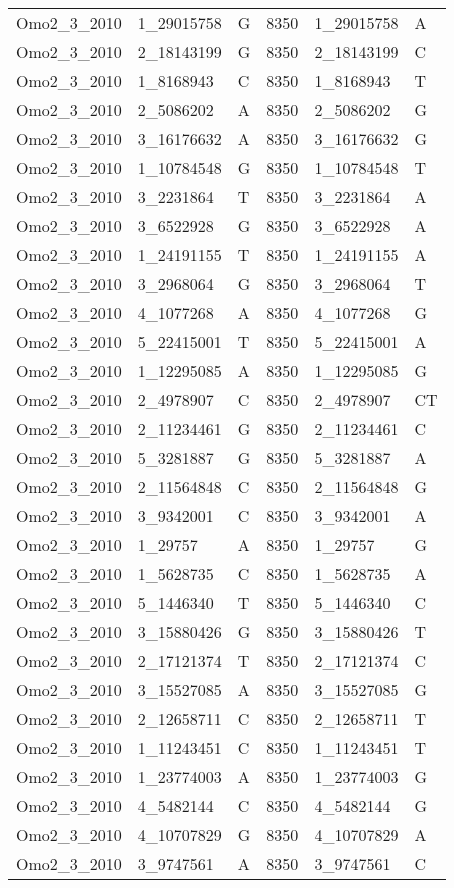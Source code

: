 \begin{center}
\begin{longtable}{|l|l|l|l|l|l|}
Omo2\_3\_2010&1\_29015758&G&8350&1\_29015758&A\\
Omo2\_3\_2010&2\_18143199&G&8350&2\_18143199&C\\
Omo2\_3\_2010&1\_8168943&C&8350&1\_8168943&T\\
Omo2\_3\_2010&2\_5086202&A&8350&2\_5086202&G\\
Omo2\_3\_2010&3\_16176632&A&8350&3\_16176632&G\\
Omo2\_3\_2010&1\_10784548&G&8350&1\_10784548&T\\
Omo2\_3\_2010&3\_2231864&T&8350&3\_2231864&A\\
Omo2\_3\_2010&3\_6522928&G&8350&3\_6522928&A\\
Omo2\_3\_2010&1\_24191155&T&8350&1\_24191155&A\\
Omo2\_3\_2010&3\_2968064&G&8350&3\_2968064&T\\
Omo2\_3\_2010&4\_1077268&A&8350&4\_1077268&G\\
Omo2\_3\_2010&5\_22415001&T&8350&5\_22415001&A\\
Omo2\_3\_2010&1\_12295085&A&8350&1\_12295085&G\\
Omo2\_3\_2010&2\_4978907&C&8350&2\_4978907&CT\\
Omo2\_3\_2010&2\_11234461&G&8350&2\_11234461&C\\
Omo2\_3\_2010&5\_3281887&G&8350&5\_3281887&A\\
Omo2\_3\_2010&2\_11564848&C&8350&2\_11564848&G\\
Omo2\_3\_2010&3\_9342001&C&8350&3\_9342001&A\\
Omo2\_3\_2010&1\_29757&A&8350&1\_29757&G\\
Omo2\_3\_2010&1\_5628735&C&8350&1\_5628735&A\\
Omo2\_3\_2010&5\_1446340&T&8350&5\_1446340&C\\
Omo2\_3\_2010&3\_15880426&G&8350&3\_15880426&T\\
Omo2\_3\_2010&2\_17121374&T&8350&2\_17121374&C\\
Omo2\_3\_2010&3\_15527085&A&8350&3\_15527085&G\\
Omo2\_3\_2010&2\_12658711&C&8350&2\_12658711&T\\
Omo2\_3\_2010&1\_11243451&C&8350&1\_11243451&T\\
Omo2\_3\_2010&1\_23774003&A&8350&1\_23774003&G\\
Omo2\_3\_2010&4\_5482144&C&8350&4\_5482144&G\\
Omo2\_3\_2010&4\_10707829&G&8350&4\_10707829&A\\
Omo2\_3\_2010&3\_9747561&A&8350&3\_9747561&C\\

\end{longtable}
\end{center}
